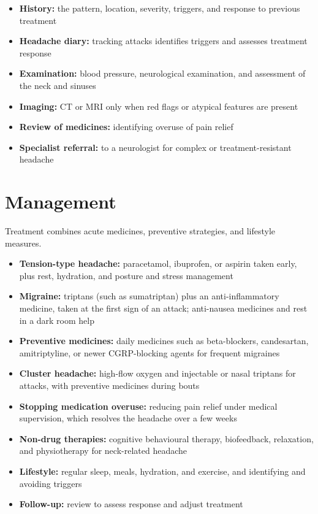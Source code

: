\begin{itemize}
    \item \textbf{History:} the pattern, location, severity, triggers, and response to previous treatment
    \item \textbf{Headache diary:} tracking attacks identifies triggers and assesses treatment response
    \item \textbf{Examination:} blood pressure, neurological examination, and assessment of the neck and sinuses
    \item \textbf{Imaging:} CT or MRI only when red flags or atypical features are present
    \item \textbf{Review of medicines:} identifying overuse of pain relief
    \item \textbf{Specialist referral:} to a neurologist for complex or treatment-resistant headache
\end{itemize}

\section*{Management}
Treatment combines acute medicines, preventive strategies, and lifestyle measures.

\begin{itemize}
    \item \textbf{Tension-type headache:} paracetamol, ibuprofen, or aspirin taken early, plus rest, hydration, and posture and stress management
    \item \textbf{Migraine:} triptans (such as sumatriptan) plus an anti-inflammatory medicine, taken at the first sign of an attack; anti-nausea medicines and rest in a dark room help
    \item \textbf{Preventive medicines:} daily medicines such as beta-blockers, candesartan, amitriptyline, or newer CGRP-blocking agents for frequent migraines
    \item \textbf{Cluster headache:} high-flow oxygen and injectable or nasal triptans for attacks, with preventive medicines during bouts
    \item \textbf{Stopping medication overuse:} reducing pain relief under medical supervision, which resolves the headache over a few weeks
    \item \textbf{Non-drug therapies:} cognitive behavioural therapy, biofeedback, relaxation, and physiotherapy for neck-related headache
    \item \textbf{Lifestyle:} regular sleep, meals, hydration, and exercise, and identifying and avoiding triggers
    \item \textbf{Follow-up:} review to assess response and adjust treatment
\end{itemize}

